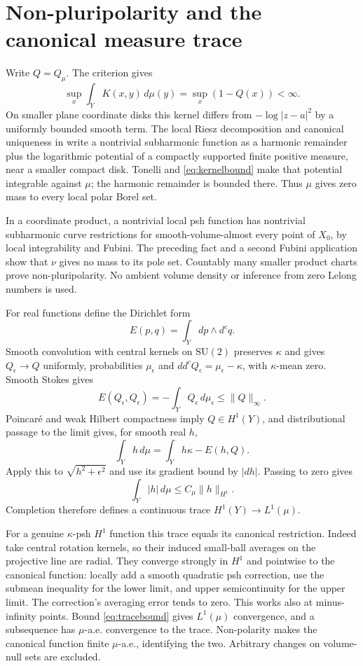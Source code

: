 \documentclass[11pt]{article}
\newcommand{\ddc}{dd^c}
\newcommand{\dc}{d^c}
\theoremstyle{remark}\newtheorem{remark}[theorem]{Remark}
\begin{document}
\section{Non-pluripolarity and the canonical measure trace}
Write $Q=Q_\mu$. The criterion gives
\begin{equation}\label{eq:kernelbound}
 \sup_x\int_YK(x,y)\,d\mu(y)=\sup_x(1-Q(x))<\infty.
\end{equation}
On smaller plane coordinate disks this kernel differs from
$-\log|z-a|^2$ by a uniformly bounded smooth term. The local Riesz
decomposition and canonical uniqueness in \cite[I.4.20--4.21]{Dem}
write a nontrivial subharmonic function as a harmonic remainder plus
the logarithmic potential of a compactly supported finite positive
measure, near a smaller compact disk. Tonelli and
\eqref{eq:kernelbound} make that potential integrable against $\mu$;
the harmonic remainder is bounded there. Thus $\mu$ gives zero mass
to every local polar Borel set.

In a coordinate product, a nontrivial local psh function has nontrivial
subharmonic curve restrictions for smooth-volume-almost every point of
$X_0$, by local integrability and Fubini. The preceding fact and a
second Fubini application show that $\nu$ gives no mass to its pole
set. Countably many smaller product charts prove non-pluripolarity.
No ambient volume density or inference from zero Lelong numbers is used.

For real functions define the Dirichlet form
\[
 E(p,q)=\int_Y dp\wedge\dc q.
\]
Smooth convolution with central kernels on $\mathrm{SU}(2)$ preserves $\kappa$ and
gives $Q_\epsilon\to Q$ uniformly, probabilities $\mu_\epsilon$ and
$\ddc Q_\epsilon=\mu_\epsilon-\kappa$, with $\kappa$-mean zero.
Smooth Stokes gives
\[
 E(Q_\epsilon,Q_\epsilon)
 =-\int_YQ_\epsilon\,d\mu_\epsilon\leq\|Q\|_\infty.
\]
Poincar\'e and weak Hilbert compactness imply $Q\in H^1(Y)$, and
distributional passage to the limit gives, for smooth real $h$,
\begin{equation}\label{eq:traceidentity}
 \int_Yh\,d\mu=\int_Yh\kappa-E(h,Q).
\end{equation}
Apply this to $\sqrt{h^2+\epsilon^2}$ and use its gradient bound by
$|dh|$. Passing to zero gives
\begin{equation}\label{eq:tracebound}
 \int_Y|h|\,d\mu\leq C_\mu\|h\|_{H^1}.
\end{equation}
Completion therefore defines a continuous trace
$H^1(Y)\to L^1(\mu)$.

For a genuine $\kappa$-psh $H^1$ function this trace equals its canonical
restriction. Indeed take central rotation kernels, so their induced
small-ball averages on the projective line are radial.
They converge strongly in $H^1$ and pointwise to the canonical function:
locally add a smooth quadratic psh correction, use the submean inequality
for the lower limit, and upper semicontinuity for the upper limit.
The correction's averaging error tends to zero. This works also at
minus-infinity points. Bound \eqref{eq:tracebound} gives $L^1(\mu)$
convergence, and a subsequence has $\mu$-a.e. convergence to the trace.
Non-polarity makes the canonical function finite $\mu$-a.e., identifying
the two. Arbitrary changes on volume-null sets are excluded.
\end{document}
